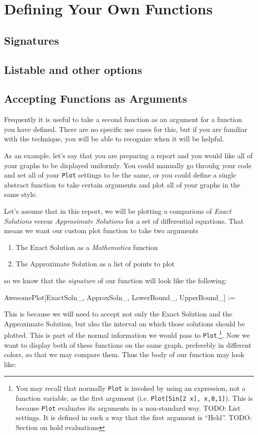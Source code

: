 \chapter{Defining Your Own Functions}
\label{chap:Functions}

\section{Signatures}

\section{Listable and other options}

\section{Accepting Functions as Arguments}

Frequently it is useful to take a second function as an argument for a function you have defined. There are no specific use cases for this, but if you are familiar with the technique, you will be able to recognize when it will be helpful.

As an example, let's say that you are preparing a report and you would like all of your graphs to be displayed uniformly. You could manually go throuhg your code and set all of your \texttt{Plot} settings to be the same, or you could define a single abstract function to take certain arguments and plot all of your graphs in the same style.

Let's assume that in this report, we will be plotting a comparions of \emph{Exact Solutions} versus \emph{Approximate Solutions} for a set of differential equations. That means we want our custom plot function to take two arguments
\begin{enumerate}
	   \item The Exact Solution as a \emph{Mathematica} function
	   \item The Approximate Solution as a list of points to plot
\end{enumerate}
so we know that the \emph{signature} of our function will look like the following:
\begin{code}
	   AwesomePlot[ExactSoln_, ApproxSoln_, LowerBound_, UpperBound_] :=
\end{code}

This is because we will need to accept not only the Exact Solution and the Approximate Solution, but also the interval on which those solutions should be plotted. This is part of the normal information we would pass to \texttt{Plot}.\footnote{You may recall that normally \texttt{Plot} is invoked by using an expression, not a function variable, as the first argument (i.e. \texttt{Plot[Sin[2 x], {x,0,1}]}). This is because \texttt{Plot} evaluates its arguments in a non-standard way. TODO: List settings. It is defined in such a way that the first argument is ``Held''. TODO: Section on hold evaluations}. Now we want to display both of these functions on the same graph, preferebly in different colors, so that we may compare them. Thus the body of our function may look like:

